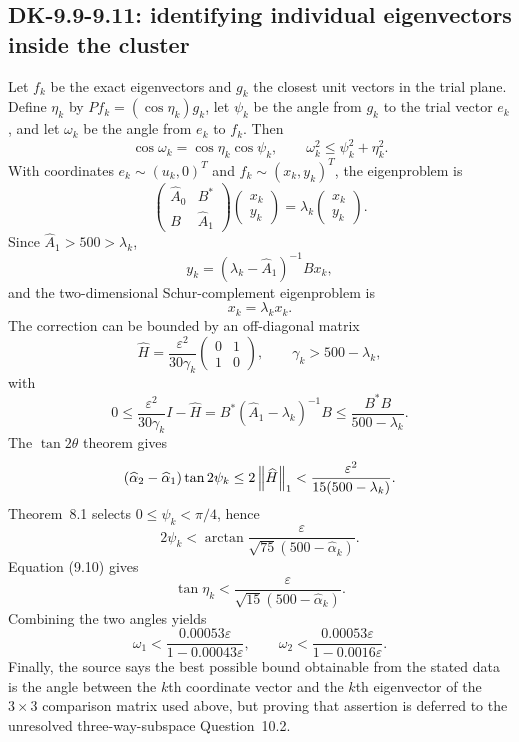 \subsection*{DK-9.9-9.11: identifying individual eigenvectors inside the cluster}
Let $f_k$ be the exact eigenvectors and $g_k$ the closest unit vectors in the trial plane.  Define $\eta_k$ by $P f_k=(\cos\eta_k)g_k$, let $\psi_k$ be the angle from $g_k$ to the trial vector $e_k$, and let $\omega_k$ be the angle from $e_k$ to $f_k$.  Then
\[
 \cos\omega_k=\cos\eta_k\cos\psi_k,
 \qquad
 \omega_k^2\le\psi_k^2+\eta_k^2.
\]
With coordinates $e_k\sim(u_k,0)^T$ and $f_k\sim(x_k,y_k)^T$, the eigenproblem is
\begin{equation}
 \begin{pmatrix}\widehat A_0&B^*\\B&\widehat A_1\end{pmatrix}
 \begin{pmatrix}x_k\\y_k\end{pmatrix}
 =\lambda_k\begin{pmatrix}x_k\\y_k\end{pmatrix}.
 \tag{9.9}
\end{equation}
Since $\widehat A_1>500>\lambda_k$,
\begin{equation}
 y_k=(\lambda_k-\widehat A_1)^{-1}Bx_k,
 \tag{9.10}
\end{equation}
and the two-dimensional Schur-complement eigenproblem is
\begin{equation}
 [\widehat A_0+B^*(\lambda_k-\widehat A_1)^{-1}B]x_k=\lambda_kx_k.
 \tag{9.11}
\end{equation}
The correction can be bounded by an off-diagonal matrix
\[
 \widehat H=\frac{\varepsilon^2}{30\gamma_k}
 \begin{pmatrix}0&1\\1&0\end{pmatrix},
 \qquad \gamma_k>500-\lambda_k,
\]
with
\[
 0\le\frac{\varepsilon^2}{30\gamma_k}I-\widehat H
 =B^*(\widehat A_1-\lambda_k)^{-1}B
 \le\frac{B^*B}{500-\lambda_k}.
\]
The $\tan2\theta$ theorem gives
\[
 (\widehat\alpha_2-\widehat\alpha_1)\tan2\psi_k
 \le2\left\lVert \widehat H\right\rVert_1
 <\frac{\varepsilon^2}{15(500-\lambda_k)}.
\]
Theorem~8.1 selects $0\le\psi_k<\pi/4$, hence
\[
 2\psi_k<\arctan\frac{\varepsilon}{\sqrt{75}(500-\widehat\alpha_k)}.
\]
Equation (9.10) gives
\[
 \tan\eta_k
 <\frac{\varepsilon}{\sqrt{15}(500-\widehat\alpha_k)}.
\]
Combining the two angles yields
\[
 \omega_1<\frac{0.00053\varepsilon}{1-0.00043\varepsilon},
 \qquad
 \omega_2<\frac{0.00053\varepsilon}{1-0.0016\varepsilon}.
\]
Finally, the source says the best possible bound obtainable from the stated data is the angle between the $k$th coordinate vector and the $k$th eigenvector of the $3\times3$ comparison matrix used above, but proving that assertion is deferred to the unresolved three-way-subspace Question~10.2.

